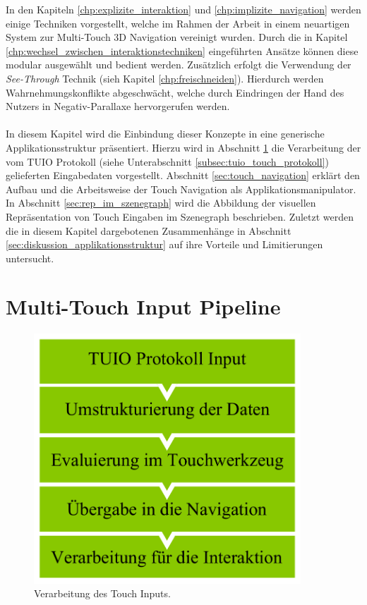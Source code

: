 In den Kapiteln \ref{chp:explizite_interaktion} und \ref{chp:implizite_navigation} werden einige Techniken vorgestellt, welche im Rahmen der Arbeit in einem neuartigen System zur Multi-Touch 3D Navigation vereinigt wurden. Durch die in Kapitel \ref{chp:wechsel_zwischen_interaktionstechniken} eingeführten Ansätze können diese modular ausgewählt und bedient werden. Zusätzlich erfolgt die Verwendung der \emph{See-Through} Technik (sieh Kapitel \ref{chp:freischneiden}). Hierdurch werden Wahrnehmungskonflikte abgeschwächt, welche durch Eindringen der Hand des Nutzers in Negativ-Parallaxe hervorgerufen werden.
\\\\
In diesem Kapitel wird die Einbindung dieser Konzepte in eine generische Applikationsstruktur präsentiert. Hierzu wird in Abschnitt \ref{sec:multitouch_input_pipeline} die Verarbeitung der vom TUIO Protokoll (siehe Unterabschnitt \ref{subsec:tuio_touch_protokoll}) gelieferten Eingabedaten vorgestellt. Abschnitt \ref{sec:touch_navigation} erklärt den Aufbau und die Arbeitsweise der Touch Navigation als Applikationsmanipulator. In Abschnitt \ref{sec:rep_im_szenegraph} wird die Abbildung der visuellen Repräsentation von Touch Eingaben im Szenegraph beschrieben. Zuletzt werden die in diesem Kapitel dargebotenen Zusammenhänge in Abschnitt \ref{sec:diskussion_applikationsstruktur} auf ihre Vorteile und Limitierungen untersucht.  


\section{Multi-Touch Input Pipeline}
\label{sec:multitouch_input_pipeline}

\begin{figure}
	\begin{center}
		\includegraphics[width=10cm]{img/input_processing.pdf}
	\end{center}
	\caption{Verarbeitung des Touch Inputs.}
	\label{fig:input_processing}
\end{figure}

